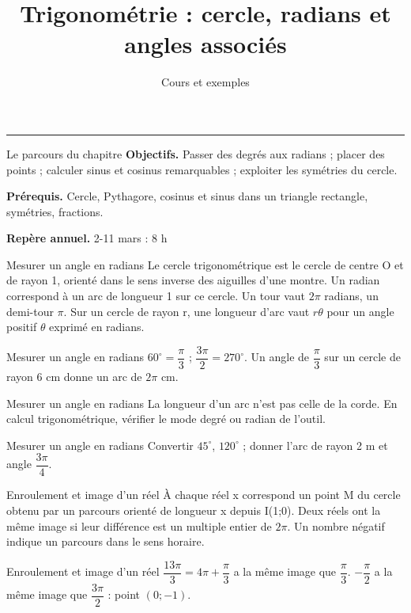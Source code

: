 \documentclass[aspectratio=169,10pt]{beamer}
\title{Trigonométrie : cercle, radians et angles associés}
\subtitle{Cours et exemples}
\date{}
\author{}
\begin{document}
\begin{frame}[plain]
\vfill
{\inserttitle\par}
\medskip
{\insertsubtitle\par}
\medskip
{\rule{\textwidth}{.5pt}}
\vfill
\end{frame}
\begin{frame}{Le parcours du chapitre}
\textbf{Objectifs.} Passer des degrés aux radians ; placer des points ; calculer sinus et cosinus remarquables ; exploiter les symétries du cercle.

\textbf{Prérequis.} Cercle, Pythagore, cosinus et sinus dans un triangle rectangle, symétries, fractions.

\textbf{Repère annuel.} 2-11 mars : 8 h
\end{frame}
\begin{frame}{Mesurer un angle en radians}
Le cercle trigonométrique est le cercle de centre O et de rayon 1, orienté dans le sens inverse des aiguilles d’une montre. Un radian correspond à un arc de longueur 1 sur ce cercle. Un tour vaut \(2\pi\) radians, un demi-tour \(\pi\). Sur un cercle de rayon r, une longueur d’arc vaut \(r\theta\) pour un angle positif \(\theta\) exprimé en radians.
\end{frame}
\begin{frame}{Mesurer un angle en radians}
\(60^\circ =\dfrac{\pi}{3}\) ; \(\dfrac{3\pi}{2}=270^\circ \). Un angle de \(\dfrac{\pi}{3}\) sur un cercle de rayon 6 cm donne un arc de \(2\pi\) cm.
\end{frame}
\begin{frame}{Mesurer un angle en radians}
La longueur d’un arc n’est pas celle de la corde. En calcul trigonométrique, vérifier le mode degré ou radian de l’outil.
\end{frame}
\begin{frame}{Mesurer un angle en radians}
Convertir \(45^\circ\), \(120^\circ\) ; donner l’arc de rayon 2 m et angle \(\dfrac{3\pi}{4}\).
\end{frame}
\begin{frame}{Enroulement et image d’un réel}
À chaque réel x correspond un point M du cercle obtenu par un parcours orienté de longueur x depuis I(1;0). Deux réels ont la même image si leur différence est un multiple entier de \(2\pi\). Un nombre négatif indique un parcours dans le sens horaire.
\end{frame}
\begin{frame}{Enroulement et image d’un réel}
\(\dfrac{13\pi}{3}=4\pi +\dfrac{\pi}{3}\) a la même image que \(\dfrac{\pi}{3}\). \(-\dfrac{\pi}{2}\) a la même image que \(\dfrac{3\pi}{2}\) : point \((0;-1)\).
\end{frame}
\end{document}
